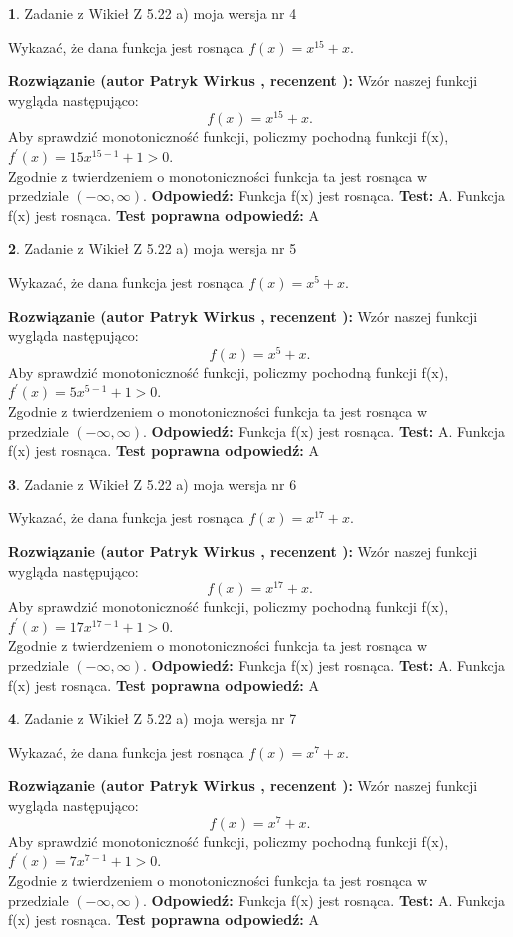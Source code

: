 \documentclass[12pt, a4paper]{article}
\theoremstyle{definition} %
\newtheorem{zad}{}
\newcommand{\zadStart}[1]{\begin{zad}#1\newline}
\newcommand{\zadStop}{\end{zad}}
\newcommand{\rozwStart}[2]{\noindent \textbf{Rozwiązanie (autor #1 , recenzent #2): }\newline}
\newcommand{\rozwStop}{\newline}
\newcommand{\odpStart}{\noindent \textbf{Odpowiedź:}\newline}
\newcommand{\odpStop}{\newline}
\newcommand{\testStart}{\noindent \textbf{Test:}\newline}
\newcommand{\testStop}{\newline}
\newcommand{\kluczStart}{\noindent \textbf{Test poprawna odpowiedź:}\newline}
\newcommand{\kluczStop}{\newline}
\begin{document}
\zadStart{Zadanie z Wikieł Z 5.22 a) moja wersja nr 4}

Wykazać, że dana funkcja jest rosnąca $f(x) = x^{15}+x$.
\zadStop
\rozwStart{Patryk Wirkus}{}
Wzór naszej funkcji wygląda następująco:
$$f(x) = x^{15}+x.$$
Aby sprawdzić monotoniczność funkcji, policzmy pochodną funkcji f(x),\\ $f^{'}(x) = 15x^{15-1}+1 > 0$.\\
Zgodnie z twierdzeniem o monotoniczności funkcja ta jest rosnąca w\\ przedziale $(-\infty,\infty)$.
\rozwStop
\odpStart
Funkcja f(x) jest rosnąca.
\odpStop
\testStart
A. Funkcja f(x) jest rosnąca.
\testStop
\kluczStart
A
\kluczStop



\zadStart{Zadanie z Wikieł Z 5.22 a) moja wersja nr 5}

Wykazać, że dana funkcja jest rosnąca $f(x) = x^{5}+x$.
\zadStop
\rozwStart{Patryk Wirkus}{}
Wzór naszej funkcji wygląda następująco:
$$f(x) = x^{5}+x.$$
Aby sprawdzić monotoniczność funkcji, policzmy pochodną funkcji f(x),\\ $f^{'}(x) = 5x^{5-1}+1 > 0$.\\
Zgodnie z twierdzeniem o monotoniczności funkcja ta jest rosnąca w\\ przedziale $(-\infty,\infty)$.
\rozwStop
\odpStart
Funkcja f(x) jest rosnąca.
\odpStop
\testStart
A. Funkcja f(x) jest rosnąca.
\testStop
\kluczStart
A
\kluczStop



\zadStart{Zadanie z Wikieł Z 5.22 a) moja wersja nr 6}

Wykazać, że dana funkcja jest rosnąca $f(x) = x^{17}+x$.
\zadStop
\rozwStart{Patryk Wirkus}{}
Wzór naszej funkcji wygląda następująco:
$$f(x) = x^{17}+x.$$
Aby sprawdzić monotoniczność funkcji, policzmy pochodną funkcji f(x),\\ $f^{'}(x) = 17x^{17-1}+1 > 0$.\\
Zgodnie z twierdzeniem o monotoniczności funkcja ta jest rosnąca w\\ przedziale $(-\infty,\infty)$.
\rozwStop
\odpStart
Funkcja f(x) jest rosnąca.
\odpStop
\testStart
A. Funkcja f(x) jest rosnąca.
\testStop
\kluczStart
A
\kluczStop



\zadStart{Zadanie z Wikieł Z 5.22 a) moja wersja nr 7}

Wykazać, że dana funkcja jest rosnąca $f(x) = x^{7}+x$.
\zadStop
\rozwStart{Patryk Wirkus}{}
Wzór naszej funkcji wygląda następująco:
$$f(x) = x^{7}+x.$$
Aby sprawdzić monotoniczność funkcji, policzmy pochodną funkcji f(x),\\ $f^{'}(x) = 7x^{7-1}+1 > 0$.\\
Zgodnie z twierdzeniem o monotoniczności funkcja ta jest rosnąca w\\ przedziale $(-\infty,\infty)$.
\rozwStop
\odpStart
Funkcja f(x) jest rosnąca.
\odpStop
\testStart
A. Funkcja f(x) jest rosnąca.
\testStop
\kluczStart
A
\kluczStop
\end{document}

